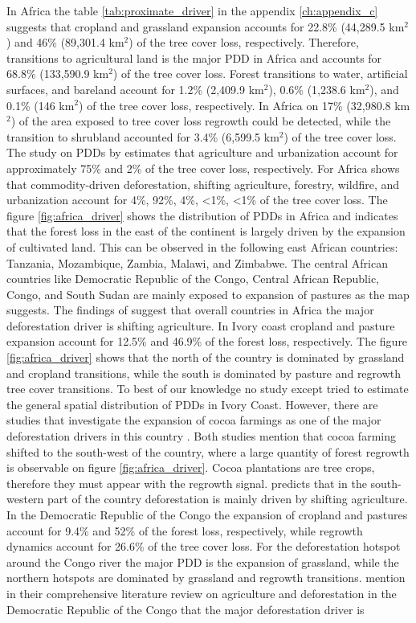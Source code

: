 			In Africa the table \ref{tab:proximate_driver} in the appendix \ref{ch:appendix_c} suggests that cropland and grassland expansion accounts for 22.8\% (44,289.5 km$^2$) and 46\% (89,301.4 km$^2$) of the tree cover loss, respectively. Therefore, transitions to agricultural land is the major \ac{PDD} in Africa and accounts for 68.8\% (133,590.9 km$^2$) of the tree cover loss. Forest transitions to water, artificial surfaces, and bareland account for 1.2\% (2,409.9 km$^2$), 0.6\% (1,238.6 km$^2$), and 0.1\% (146 km$^2$) of the tree cover loss, respectively. In Africa on 17\% (32,980.8 km$^2$) of the area exposed to tree cover loss regrowth could be detected, while the transition to shrubland accounted for 3.4\% (6,599.5 km$^2$) of the tree cover loss. The study on \acp{PDD} by \citet{Hosonuma2012} estimates that agriculture and urbanization account for approximately 75\% and 2\% of the tree cover loss, respectively. For Africa \citet{Curtis2018} shows that commodity-driven deforestation, shifting agriculture, forestry, wildfire, and urbanization account for 4\%, 92\%, 4\%, <1\%, <1\% of the tree cover loss. The figure \ref{fig:africa_driver} shows the distribution of \acp{PDD} in Africa and indicates that the forest loss in the east of the continent is largely driven by the expansion of cultivated land. This can be observed in the following east African countries: Tanzania, Mozambique, Zambia, Malawi, and Zimbabwe. The central African countries like Democratic Republic of the Congo, Central African Republic, Congo, and South Sudan are mainly exposed to expansion of pastures as the map suggests. The findings of \citet{Curtis2018} suggest that overall countries in Africa the major deforestation driver is shifting agriculture. In Ivory coast cropland and pasture expansion account for 12.5\% and 46.9\% of the forest loss, respectively. The figure \ref{fig:africa_driver} shows that the north of the country is dominated by grassland and cropland transitions, while the south is dominated by pasture and regrowth tree cover transitions. To best of our knowledge no study except \citet{Curtis2018} tried to estimate the general spatial distribution of \acp{PDD} in Ivory Coast. However, there are studies that investigate the expansion of cocoa farmings as one of the major deforestation drivers in this country \citep{Barima2016,Ruf2014}. Both studies mention that cocoa farming shifted to the south-west of the country, where a large quantity of forest regrowth is observable on figure \ref{fig:africa_driver}. Cocoa plantations are tree crops, therefore they must appear with the regrowth signal. \citet{Curtis2018} predicts that in the south-western part of the country deforestation is mainly driven by shifting agriculture. In the Democratic Republic of the Congo the expansion of cropland and pastures account for 9.4\% and 52\% of the forest loss, respectively, while regrowth dynamics account for 26.6\% of the tree cover loss. For the deforestation hotspot around the Congo river the major \ac{PDD} is the expansion of grassland, while the northern hotspots are dominated by grassland and regrowth transitions. \citet{Ickowitz2015} mention in their comprehensive literature review on agriculture and deforestation in the Democratic Republic of the Congo that the major deforestation driver is 